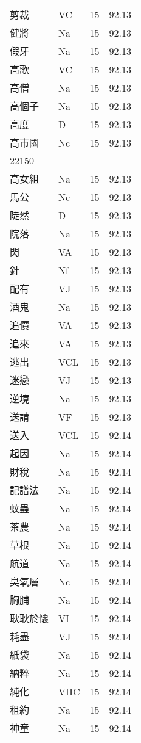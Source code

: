 \documentclass[twocolumn]{book}
\begin{document}
\begin{supertabular}{llrr}
剪裁 & VC & 15 &  92.13\\
健將 & Na & 15 &  92.13\\
假牙 & Na & 15 &  92.13\\
高歌 & VC & 15 &  92.13\\
高僧 & Na & 15 &  92.13\\
高個子 & Na & 15 &  92.13\\
高度 & D & 15 &  92.13\\
高市國 & Nc & 15 &  92.13\\
22150\\
高女組 & Na & 15 &  92.13\\
馬公 & Nc & 15 &  92.13\\
陡然 & D & 15 &  92.13\\
院落 & Na & 15 &  92.13\\
閃 & VA & 15 &  92.13\\
針 & Nf & 15 &  92.13\\
配有 & VJ & 15 &  92.13\\
酒鬼 & Na & 15 &  92.13\\
追價 & VA & 15 &  92.13\\
追來 & VA & 15 &  92.13\\
逃出 & VCL & 15 &  92.13\\
迷戀 & VJ & 15 &  92.13\\
逆境 & Na & 15 &  92.13\\
送請 & VF & 15 &  92.13\\
送入 & VCL & 15 &  92.14\\
起因 & Na & 15 &  92.14\\
財稅 & Na & 15 &  92.14\\
記譜法 & Na & 15 &  92.14\\
蚊蟲 & Na & 15 &  92.14\\
茶農 & Na & 15 &  92.14\\
草根 & Na & 15 &  92.14\\
航道 & Na & 15 &  92.14\\
臭氧層 & Nc & 15 &  92.14\\
胸脯 & Na & 15 &  92.14\\
耿耿於懷 & VI & 15 &  92.14\\
耗盡 & VJ & 15 &  92.14\\
紙袋 & Na & 15 &  92.14\\
納粹 & Na & 15 &  92.14\\
純化 & VHC & 15 &  92.14\\
租約 & Na & 15 &  92.14\\
神童 & Na & 15 &  92.14\\

\end{supertabular}
\end{document}

